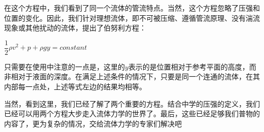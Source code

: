         在这个方程中，我们看到了同一个流体的管流特点。当然，这个方程忽略了压强和位置的变化。因此，我们针对理想流体，即不可被压缩、遵循管流原理、没有湍流现象或其他扰动的流体，提出了伯努利方程：
        \begin{law}
            \centering
            $\dfrac{1}{2}\rho v^2 +p+\rho gy=constant$
        \end{law}

        只需要在使用中注意的一点是，这里的$y$表示的是位置相对于参考平面的高度，而非相对于液面的深度。在满足上述条件的情况下，只要是同一个连通的流体，在其内部每一点处，上述等式左边的结果均相等。

        当然，看到这里，我们已经了解了两个重要的方程。结合中学的压强的定义，我们已经可以用两个方程大步走入流体力学的世界了。最后，这些已经足够我们普物的内容了，更为复杂的情况，交给流体力学的专家们解决吧
